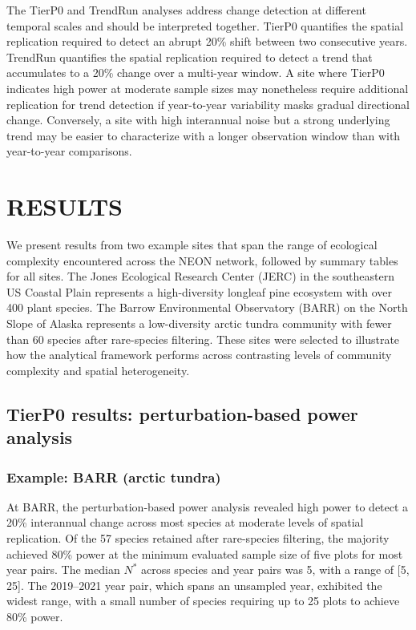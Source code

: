 \documentclass[
  11pt,
]{article}
\begin{document}
The TierP0 and TrendRun analyses address change detection at different
temporal scales and should be interpreted together. TierP0 quantifies
the spatial replication required to detect an abrupt 20\% shift between
two consecutive years. TrendRun quantifies the spatial replication
required to detect a trend that accumulates to a 20\% change over a
multi-year window. A site where TierP0 indicates high power at moderate
sample sizes may nonetheless require additional replication for trend
detection if year-to-year variability masks gradual directional change.
Conversely, a site with high interannual noise but a strong underlying
trend may be easier to characterize with a longer observation window
than with year-to-year comparisons.

\section{\uppercase{Results}}

We present results from two example sites that span the range of
ecological complexity encountered across the NEON network, followed by
summary tables for all sites. The Jones Ecological Research Center
(JERC) in the southeastern US Coastal Plain represents a high-diversity
longleaf pine ecosystem with over 400 plant species. The Barrow
Environmental Observatory (BARR) on the North Slope of Alaska represents
a low-diversity arctic tundra community with fewer than 60 species after
rare-species filtering. These sites were selected to illustrate how the
analytical framework performs across contrasting levels of community
complexity and spatial heterogeneity.

\subsection{TierP0 results: perturbation-based power analysis}

\subsubsection{Example: BARR (arctic
tundra)}\label{example-barr-arctic-tundra}

At BARR, the perturbation-based power analysis revealed high power to
detect a 20\% interannual change across most species at moderate levels
of spatial replication. Of the 57 species retained after rare-species
filtering, the majority achieved 80\% power at the minimum evaluated
sample size of five plots for most year pairs. The median \(N^*\) across
species and year pairs was 5, with a range of {[}5, 25{]}. The
2019--2021 year pair, which spans an unsampled year, exhibited the
widest range, with a small number of species requiring up to 25 plots to
achieve 80\% power.
\end{document}
